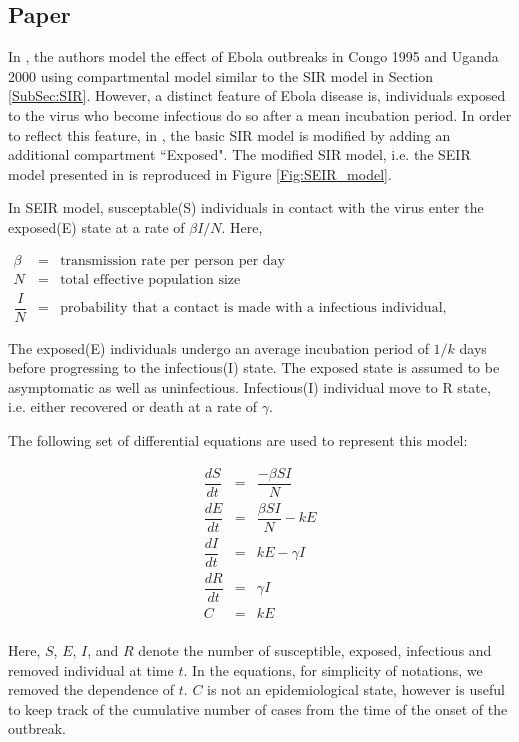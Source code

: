 \documentclass[12pt, journal,onecolumn]{IEEEtran}
\begin{document}
\subsection{Paper \cite{chowell2004basic}}
In  \cite{chowell2004basic}, the authors model the effect of Ebola outbreaks in Congo 1995 and Uganda 2000 using compartmental model similar to the SIR model in Section \ref{SubSec:SIR}. However, a distinct feature of Ebola disease is, individuals exposed to the virus who become infectious do so after a mean incubation period. In order to reflect this feature, in \cite{chowell2004basic}, the basic SIR model is modified by adding an additional compartment ``Exposed". The modified SIR model, i.e. the SEIR model presented in  \cite{chowell2004basic} is reproduced in Figure \ref{Fig:SEIR_model}.

In SEIR model, susceptable(S) individuals in contact with the virus enter the exposed(E) state at a rate of $\beta I / N$. Here,

\begin{eqnarray*}
\beta &=& \text{transmission rate per person per day}\\
N &=& \text{total effective population size}\\
\dfrac{I}{N} &=& \text{probability that a contact is made with a infectious individual, assuming random uniform mixing}
\end{eqnarray*}

The exposed(E) individuals undergo an average incubation period of $1/k$ days before progressing to the infectious(I) state. The exposed state is assumed to be asymptomatic as well as uninfectious. Infectious(I) individual move to R state, i.e. either recovered or death at a rate of $\gamma$.

The following set of differential equations are used to represent this model:

\begin{eqnarray}
\label{Eq:SEIR}
\dfrac{dS}{dt}	&=&	\dfrac{-\beta SI}{N}\nonumber\\
\dfrac{dE}{dt}	&=&	\dfrac{\beta SI}{N}-kE\nonumber\\
\dfrac{dI}{dt}	&=&	kE-\gamma I\nonumber\\
\dfrac{dR}{dt}	&=&	\gamma I\nonumber\\
C	&=&	kE\nonumber\\
 \end{eqnarray}
 
 Here, $S$, $E$, $I$, and $R$ denote the number of susceptible, exposed, infectious and removed individual at time $t$. In the equations, for simplicity of notations, we removed the dependence of $t$. $C$ is not an epidemiological state, however is useful to keep track of the cumulative number of cases from the time of the onset of the outbreak.
 
\end{document}
